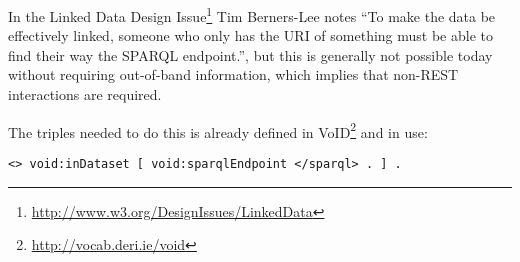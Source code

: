 \documentclass{llncs}
\begin{document}
In the Linked Data Design
Issue\footnote{\url{http://www.w3.org/DesignIssues/LinkedData}} Tim
Berners-Lee notes ``To make the data be effectively linked, someone
who only has the URI of something must be able to find their way the
SPARQL endpoint.'', but this is generally not possible today without
requiring out-of-band information, which implies that non-REST
interactions are required. 

The triples needed to do this is already defined in
VoID\footnote{\url{http://vocab.deri.ie/void}} and in use:
\begin{verbatim}
<> void:inDataset [ void:sparqlEndpoint </sparql> . ] .
\end{verbatim}




%
%

\end{document}
